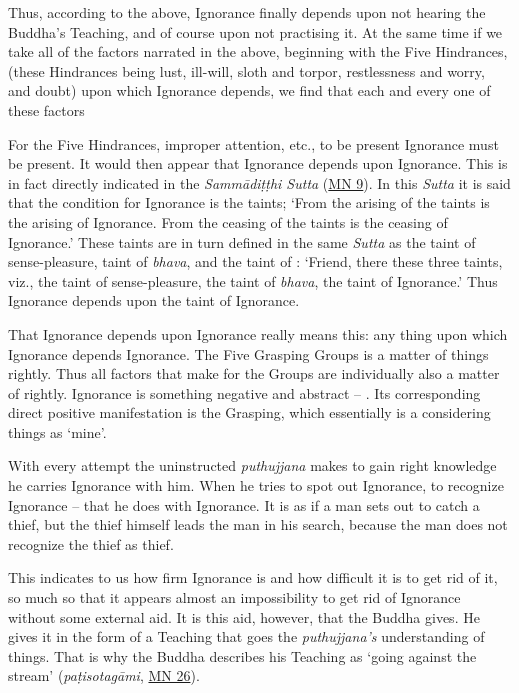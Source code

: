 Thus, according to the above, Ignorance finally depends upon not hearing the Buddha's Teaching, and of course upon not practising it. At the same time if we take all of the factors narrated in the above, beginning with the Five Hindrances, (these Hindrances being lust, ill-will, sloth and torpor, restlessness and worry, and doubt) upon which Ignorance depends, we find that each and every one of these factors 

For the Five Hindrances, improper attention, etc., to be present Ignorance must be present. It would then appear that Ignorance depends upon Ignorance. This is in fact directly indicated in the \emph{Sammādiṭṭhi Sutta} (\href{https://suttacentral.net/mn9/en/bodhi}{MN 9}). In this \emph{Sutta} it is said that the condition for Ignorance is the taints; `From the arising of the taints is the arising of Ignorance. From the ceasing of the taints is the ceasing of Ignorance.' These taints are in turn defined in the same \emph{Sutta} as the taint of sense-pleasure, taint of \emph{bhava}, and the taint of : `Friend, there these three taints, viz., the taint of sense-pleasure, the taint of \emph{bhava}, the taint of Ignorance.' Thus Ignorance depends upon the taint of Ignorance.

That Ignorance depends upon Ignorance really means this: any thing upon which Ignorance depends  Ignorance. The Five Grasping Groups is a matter of  things rightly. Thus all factors that make for the  Groups are \mbox{individually} also a matter of  rightly. Ignorance is something negative and abstract -- . Its corresponding direct positive manifestation is the Grasping, which essentially is a considering things as `mine'.

With every attempt the uninstructed \emph{puthujjana} makes to gain right knowledge he carries Ignorance with him. When he tries to spot out Ignorance, to recognize Ignorance -- that he does with Ignorance. It is as if a man sets out to catch a thief, but the thief himself leads the man in his search, because the man does not recognize the thief as  thief.

This indicates to us how firm Ignorance is and how difficult it is to get rid of it, so much so that it appears almost an impossibility to get rid of Ignorance without some external aid. It is this aid, however, that the Buddha gives. He gives it in the form of a Teaching that goes  the \emph{puthujjana's} understanding of things. That is why the Buddha describes his Teaching as `going against the stream' (\emph{paṭisotagāmi}, \href{https://suttacentral.net/mn26/en/bodhi}{MN 26}).

